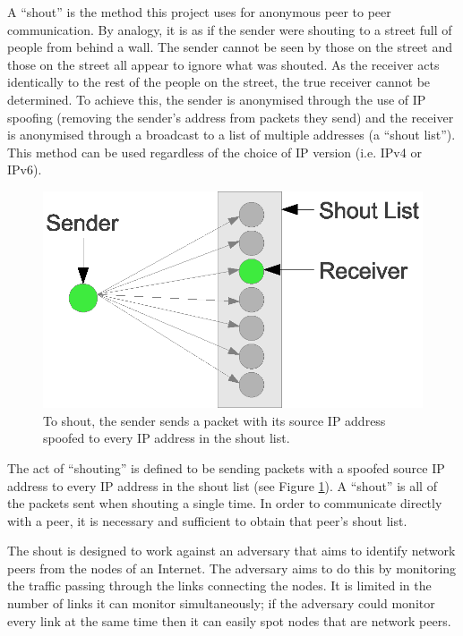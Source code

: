 \documentclass[ %
                    author={Luke Murray},
                supervisor={Dr. Simon Hollis},
                     title={Shadow Peer-to-Peer Networks},
                  subtitle={},
                    degree={MEng},
                      year={2013} ]{thesis}
\begin{document}
A ``shout'' is the method this project uses for anonymous peer to peer communication. By analogy, it is as if the sender were shouting to a street full of people from behind a wall. The sender cannot be seen by those on the street and those on the street all appear to ignore what was shouted. As the receiver acts identically to the rest of the people on the street, the true receiver cannot be determined. To achieve this, the sender is anonymised through the use of IP spoofing (removing the sender's address from packets they send) and the receiver is anonymised through a broadcast to a list of multiple addresses (a ``shout list''). This method can be used regardless of the choice of IP version (i.e. IPv4 or IPv6).

\begin{figure}[h]
    \centering
    \includegraphics{diagrams/shouting.eps}
    \caption{To shout, the sender sends a packet with its source IP address spoofed to every IP address in the shout list.}
    \label{shouting}
\end{figure}

The act of ``shouting'' is defined to be sending packets with a spoofed source IP address to every IP address in the shout list (see Figure \ref{shouting}). A ``shout'' is all of the packets sent when shouting a single time. In order to communicate directly with a peer, it is necessary and sufficient to obtain that peer's shout list.

The shout is designed to work against an adversary that aims to identify network peers from the nodes of an Internet. The adversary aims to do this by monitoring the traffic passing through the links connecting the nodes. It is limited in the number of links it can monitor simultaneously; if the adversary could monitor every link at the same time then it can easily spot nodes that are network peers.
\end{document}
